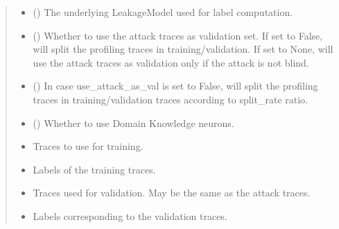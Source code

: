 \documentclass[letterpaper,10pt,english]{sphinxmanual}
\begin{document}
\begin{fulllineitems}
\begin{fulllineitems}
\begin{quote}
\begin{description}
\begin{itemize}
\item {} 
\sphinxAtStartPar
{} ({\hyperref[\detokenize{MLSCAlib.Ciphers:MLSCAlib.Ciphers.leakage_model.LeakageModel}]{}}) \textendash{} The underlying LeakageModel used for label computation.

\item {} 
\sphinxAtStartPar
{} () \textendash{} Whether to use the attack traces as validation set. If set to False, will split the profiling traces
in training/validation. If set to None, will use the attack traces as validation only if the
attack is not blind.

\item {} 
\sphinxAtStartPar
{} (\sphinxstyleliteralemphasis{\sphinxupquote{, }}) \textendash{} In case use\_attack\_as\_val is set to False, will split the profiling traces in training/validation
traces according to split\_rate ratio.

\item {} 
\sphinxAtStartPar
{} () \textendash{} Whether to use Domain Knowledge neurons.

\end{itemize}

\sphinxAtStartPar
\begin{itemize}
\item {} 
\sphinxAtStartPar
{} \textendash{} Traces to use for training.

\item {} 
\sphinxAtStartPar
{} \textendash{} Labels of the training traces.

\item {} 
\sphinxAtStartPar
{} \textendash{} Traces used for validation. May be the same as the attack traces.

\item {} 
\sphinxAtStartPar
{} \textendash{} Labels corresponding to the validation traces.


\end{itemize}
\end{description}
\end{quote}
\end{fulllineitems}
\end{fulllineitems}
\end{document}
